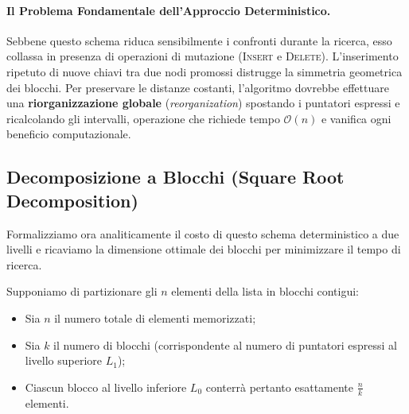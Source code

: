 \paragraph{Il Problema Fondamentale dell'Approccio Deterministico.}
Sebbene questo schema riduca sensibilmente i confronti durante la ricerca, esso collassa in presenza di operazioni di mutazione (\textsc{Insert} e \textsc{Delete}). L'inserimento ripetuto di nuove chiavi tra due nodi promossi distrugge la simmetria geometrica dei blocchi. Per preservare le distanze costanti, l'algoritmo dovrebbe effettuare una \textbf{riorganizzazione globale} (\textit{reorganization}) spostando i puntatori espressi e ricalcolando gli intervalli, operazione che richiede tempo $\mathcal{O}(n)$ e vanifica ogni beneficio computazionale.

\subsection{Decomposizione a Blocchi (Square Root Decomposition)}
Formalizziamo ora analiticamente il costo di questo schema deterministico a due livelli e ricaviamo la dimensione ottimale dei blocchi per minimizzare il tempo di ricerca.

Supponiamo di partizionare gli $n$ elementi della lista in blocchi contigui:
\begin{itemize}
  \item Sia $n$ il numero totale di elementi memorizzati;
  \item Sia $k$ il numero di blocchi (corrispondente al numero di puntatori espressi al livello superiore $L_1$);
  \item Ciascun blocco al livello inferiore $L_0$ conterrà pertanto esattamente $\frac{n}{k}$ elementi.
\end{itemize}

